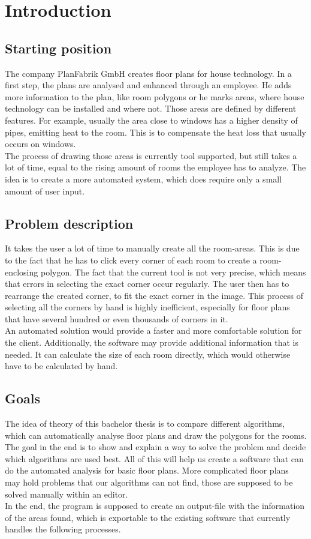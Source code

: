 \section{Introduction}
\label{sub:Introduction}
\subsection{Starting position}
The company PlanFabrik GmbH creates floor plans for house technology. In a first
step, the plans are analysed and enhanced through an employee. He adds more
information to the plan, like room polygons or he marks areas, where house technology
can be installed and where not. Those areas are defined by different features. For example, usually the area close to windows has a higher density of pipes, emitting heat to the room. This is to compensate the heat loss that usually occurs on windows.
\\
The process of drawing those areas is currently tool supported, but still takes a lot of time, equal to the rising amount of rooms the employee has to analyze. The idea is to create a more automated system, which does require only a small amount of user input.

\subsection{Problem description}
\label{sub:ProblemDescription}
It takes the user a lot of time to manually create all the room-areas. This is due to the fact that he has to click every corner of each room to create a room-enclosing polygon. The fact that the current tool is not very precise, which means that errors in selecting the exact corner occur regularly. The user then has to rearrange the created corner, to fit the exact corner in the image. This process of selecting all the corners by hand is highly inefficient, especially for floor plans that have several hundred or even thousands of corners in it.
\\
An automated solution would provide a faster and more comfortable solution for the client. Additionally, the software may provide additional information that is needed. It can calculate the size of each room directly, which would otherwise have to be calculated by hand.

\subsection{Goals}
The idea of theory of this bachelor thesis is to compare different algorithms, which can automatically analyse floor plans and draw the polygons for the rooms. The goal in the end is to show and explain a way to solve the problem and decide which algorithms are used best. All of this will help us create a software that can do the automated analysis for basic floor plans. More complicated floor plans may hold problems that our algorithms can not find, those are supposed to be solved manually within an editor.
\\
In the end, the program is supposed to create an output-file with the information of the areas found, which is exportable to the existing software that currently handles the following processes.

